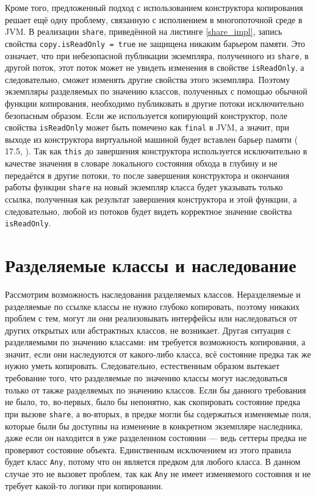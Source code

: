 \documentclass[specification,annotation,times]{itmo-student-thesis}
\begin{document}
Кроме того, предложенный подход с использованием конструктора копирования решает ещё одну проблему, связанную с исполнением в многопоточной среде в JVM.
В реализации \texttt{share}, приведённой на листинге \ref{share_impl}, запись свойства \texttt{copy.isReadOnly = true} не защищена никаким барьером памяти.
Это означает, что при небезопасной публикации экземпляра, полученного из \texttt{share}, в другой поток, этот поток может не увидеть изменения в свойстве \texttt{isReadOnly}, а следовательно, сможет изменять другие свойства этого экземпляра.
Поэтому экземпляры разделяемых по значению классов, полученных с помощью обычной функции копирования, необходимо публиковать в другие потоки исключительно безопасным образом.
Если же используется копирующий конструктор, поле свойства \texttt{isReadOnly} может быть помечено как \texttt{final} в JVM, а значит,
при выходе из конструктора виртуальной машиной будет вставлен барьер памяти (\cite{jvm8-spec} 17.5, \cite{shipilev-final}).
Так как \texttt{this} до завершения конструктора используется исключительно в качестве значения в словаре локального состояния обхода в глубину и не передаётся в другие потоки, то после завершения конструктора и окончания работы функции \texttt{share} на новый экземпляр класса будет указывать только ссылка, полученная как результат завершения конструктора и этой функции, а следовательно, любой из потоков будет видеть корректное значение свойства \texttt{isReadOnly}.

\section{Разделяемые классы и наследование}\label{inheritance}

Рассмотрим возможность наследования разделяемых классов.
Неразделяемые и разделяемые по ссылке классы не нужно глубоко копировать, поэтому никаких проблем с тем, могут ли они реализовывать интерфейсы или наследоваться от других открытых или абстрактных классов, не возникает.
Другая ситуация с разделяемыми по значению классами: им требуется возможность копирования, а значит, если они наследуются от какого-либо класса, всё состояние предка так же нужно уметь копировать.
Следовательно, естественным образом вытекает требование того, что разделяемые по значению классы могут наследоваться только от также разделяемых по значению классов.
Если бы данного требования не было, то, во-первых, было бы непонятно, как скопировать состояние предка при вызове \texttt{share}, а во-вторых, в предке могли бы содержаться изменяемые поля, которые были бы доступны на изменение в конкретном экземпляре наследника, даже если он находится в уже разделенном состоянии --- ведь сеттеры предка не проверяют состояние объекта.
Единственным исключением из этого правила будет класс \texttt{Any}, потому что он является предком для любого класса.
В данном случае это не вызовет проблем, так как \texttt{Any} не имеет изменяемого состояния и не требует какой-то логики при копировании.
\end{document}
